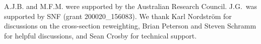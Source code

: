 A.J.B. and M.F.M. were supported by the Australian Research Council. J.G.~was supported by SNF (grant 200020\_156083). We thank Karl Nordstr{\"o}m for discussions on the cross-section reweighting, Brian Peterson and Steven Schramm for helpful discussions, and Sean Crosby for technical support.